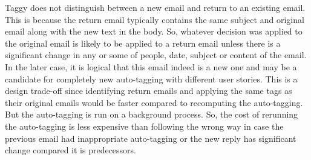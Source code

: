 Taggy does not distinguish between a new email and return to an existing email. This is because the return email typically contains the same subject and original email along with the new text in the body. So, whatever decision was applied to the original email is likely to be applied to a return email unless there is a significant change in any or some of people, date, subject or content of the email. In the later case, it is logical that this email indeed is a new one and may be a candidate for completely new auto-tagging with different user stories. This is a design trade-off since identifying return emails and applying the same tags as their original emails would be faster compared to recomputing the auto-tagging. But the auto-tagging is run on a background process. So, the cost of rerunning the auto-tagging is less expensive than following the wrong way in case the previous email had inappropriate auto-tagging or the new reply has significant change compared it is predecessors.

